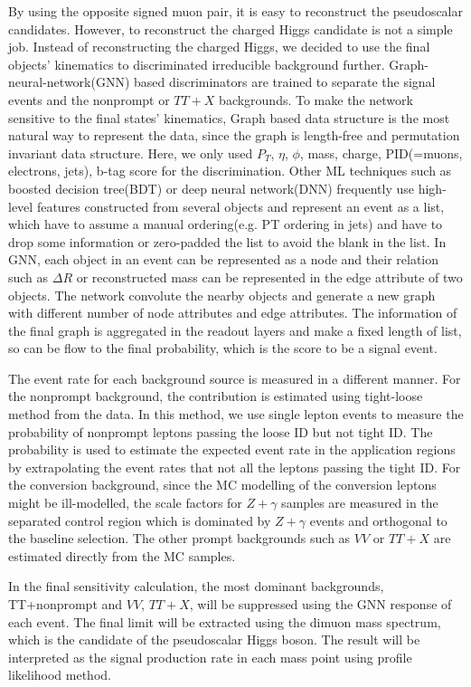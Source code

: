 \documentclass[
12pt, %
a4paper, %
oneside, %
headinclude,footinclude, %
BCOR5mm, %
]{scrartcl}
\begin{document}
By using the opposite signed muon pair, it is easy to reconstruct the pseudoscalar candidates.
However, to reconstruct the charged Higgs candidate is not a simple job. Instead of reconstructing
the charged Higgs, we decided to use the final objects' kinematics 
to discriminated irreducible background further.
Graph-neural-network(GNN) based discriminators are trained to separate the signal events 
and the nonprompt or $TT + X$ backgrounds. 
To make the network sensitive to the final states' kinematics, Graph based data structure
is the most natural way to represent the data, since the graph is length-free and permutation invariant data structure.
Here, we only used $P_T$, $\eta$, $\phi$, mass, charge, PID(=muons, electrons, jets), b-tag score for the discrimination.
Other ML techniques such as boosted decision tree(BDT) or deep neural network(DNN) frequently use high-level
features constructed from several objects and represent an event
as a list, which have to assume a manual ordering(e.g. PT ordering in jets) and have to drop some information or
zero-padded the list to avoid the blank in the list.
In GNN, each object in an event can be represented as a node and their relation such as $\Delta R$ or reconstructed mass
can be represented in the edge attribute of two objects. The network convolute the nearby objects and generate a new graph
with different number of node attributes and edge attributes. The information of the final graph is aggregated in the readout
layers and make a fixed length of list, so can be flow to the final probability, which is the score to be a signal event.

The event rate for each background source is measured in a different manner.
For the nonprompt background, the contribution is estimated using tight-loose method from the data. 
In this method, we use single lepton events to measure the probability of nonprompt leptons passing the loose ID but not tight ID. 
The probability is used to estimate the expected event rate in the application regions 
by extrapolating the event rates that not all the leptons passing the tight ID. 
For the conversion background, since the MC modelling of the conversion leptons might be ill-modelled, 
the scale factors for $Z+\gamma$ samples are measured in the separated control region 
which is dominated by $Z+\gamma$ events and orthogonal to the baseline selection.
The other prompt backgrounds such as $VV$ or $TT + X$ are estimated directly from the MC samples.

In the final sensitivity calculation, the most dominant backgrounds, 
TT+nonprompt and $VV$, $TT + X$, 
will be suppressed using the GNN response of each event.
The final limit will be extracted using the dimuon mass spectrum, which is the candidate
of the pseudoscalar Higgs boson.
The result will be interpreted as the signal production rate in each mass point using profile likelihood method.
\end{document}
